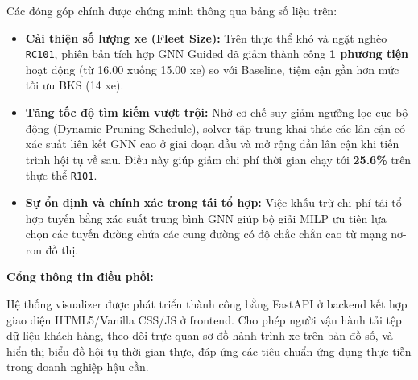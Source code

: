 \documentclass[13pt,a4paper]{extarticle}
\begin{document}
\begin{table}[!h]
\centering
\caption{Kết quả so sánh hiệu năng giữa Baseline (không có GNN) và GNN Guided (150 vòng lặp)}
\label{tab:gnn_comparison_vn}
\renewcommand{\arraystretch}{1.08}
\end{table}

Các đóng góp chính được chứng minh thông qua bảng số liệu trên:
\begin{itemize}[leftmargin=1.2cm]
  \item \textbf{Cải thiện số lượng xe (Fleet Size):} Trên thực thể khó và ngặt nghèo \texttt{RC101}, phiên bản tích hợp GNN Guided đã giảm thành công \textbf{1 phương tiện} hoạt động (từ 16.00 xuống 15.00 xe) so với Baseline, tiệm cận gần hơn mức tối ưu BKS (14 xe).
  \item \textbf{Tăng tốc độ tìm kiếm vượt trội:} Nhờ cơ chế suy giảm ngưỡng lọc cục bộ động (Dynamic Pruning Schedule), solver tập trung khai thác các lân cận có xác suất liên kết GNN cao ở giai đoạn đầu và mở rộng dần lân cận khi tiến trình hội tụ về sau. Điều này giúp giảm chi phí thời gian chạy tới \textbf{25.6\%} trên thực thể \texttt{R101}.
  \item \textbf{Sự ổn định và chính xác trong tái tổ hợp:} Việc khấu trừ chi phí tái tổ hợp tuyến bằng xác suất trung bình GNN giúp bộ giải MILP ưu tiên lựa chọn các tuyến đường chứa các cung đường có độ chắc chắn cao từ mạng nơ-ron đồ thị.
\end{itemize}

\textbf{Cổng thông tin điều phối:}

Hệ thống visualizer được phát triển thành công bằng FastAPI ở backend kết hợp giao diện HTML5/Vanilla CSS/JS ở frontend. Cho phép người vận hành tải tệp dữ liệu khách hàng, theo dõi trực quan sơ đồ hành trình xe trên bản đồ số, và hiển thị biểu đồ hội tụ thời gian thực, đáp ứng các tiêu chuẩn ứng dụng thực tiễn trong doanh nghiệp hậu cần.
\clearpage
\end{document}
